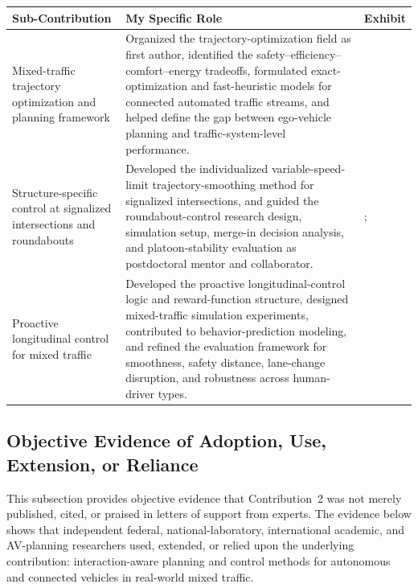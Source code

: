 \documentclass[11pt,letterpaper]{article}
\renewcommand{\arraystretch}{1.18}
\begin{document}
\begin{singlespace}
\small
\renewcommand{\arraystretch}{1.08}
\begin{tabularx}{\textwidth}{@{}p{}p{}Y@{}}
\toprule
\textbf{Sub-Contribution} & \textbf{My Specific Role} & \textbf{Exhibit} \\
\midrule

Mixed-traffic trajectory optimization and planning framework &
Organized the trajectory-optimization field as first author, identified the safety--efficiency--comfort--energy tradeoffs, formulated exact-optimization and fast-heuristic models for connected automated traffic streams, and helped define the gap between ego-vehicle planning and traffic-system-level performance. &
 \\

Structure-specific control at signalized intersections and roundabouts &
Developed the individualized variable-speed-limit trajectory-smoothing method for signalized intersections, and guided the roundabout-control research design, simulation setup, merge-in decision analysis, and platoon-stability evaluation as postdoctoral mentor and collaborator. &
;  \\

Proactive longitudinal control for mixed traffic &
Developed the proactive longitudinal-control logic and reward-function structure, designed mixed-traffic simulation experiments, contributed to behavior-prediction modeling, and refined the evaluation framework for smoothness, safety distance, lane-change disruption, and robustness across human-driver types. &
 \\

\bottomrule
\end{tabularx}
\end{singlespace}

\subsection{Objective Evidence of Adoption, Use, Extension, or Reliance}
This subsection provides objective evidence that Contribution~2 was not merely published, cited, or praised in letters of support from experts. The evidence below shows that independent federal, national-laboratory, international academic, and AV-planning researchers used, extended, or relied upon the underlying contribution: interaction-aware planning and control methods for autonomous and connected vehicles in real-world mixed traffic.
\end{document}
